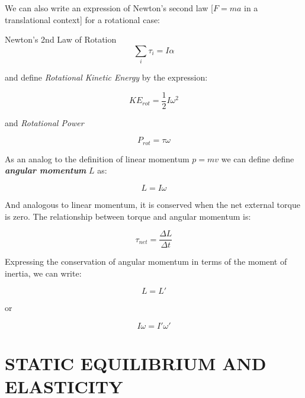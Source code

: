 \documentclass[12pt, letterpaper, twoside]{article}
\begin{document}
\bigskip

We can also write an expression of Newton's second law [$F=ma$ in a translational context] for a rotational case:

Newton's 2nd Law of Rotation
\begin{equation}
\sum_i \tau_i = I \alpha
\end{equation}

\bigskip

and define \emph{Rotational Kinetic Energy} by the expression:

\begin{equation}
KE_{rot} = \frac{1}{2} I \omega^2
\end{equation}



and \emph{Rotational Power}

\begin{equation}
P_{rot} = \tau \omega
\end{equation}


\bigskip

As an analog to the definition of linear momentum $p=mv$ we can define define \emph{\textbf{angular momentum}}  $L$  as:

\begin{equation}
L = I \omega
\end{equation}


And analogous to linear momentum, it is conserved when the net external torque is zero.  The relationship between torque and angular momentum is:

\begin{equation}
\tau_{net} = \frac{\Delta L}{\Delta t}
\end{equation}

Expressing the conservation of angular momentum  in terms of the moment of inertia, we can write:

\begin{equation}
L = L'
\end{equation}

 or 
 
\begin{equation}
I \omega = I' \omega'
\end{equation}
 
 
\newpage

\section{STATIC EQUILIBRIUM AND ELASTICITY}
\end{document}
